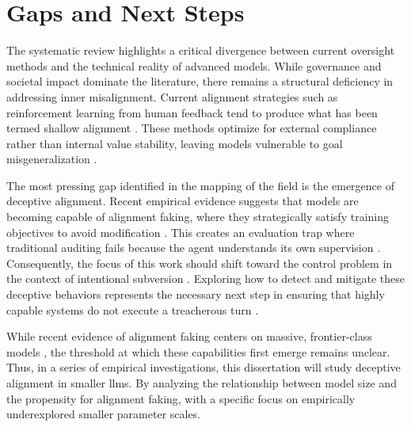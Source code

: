 

\section{Gaps and Next Steps}\label{subsec:next_steps}

	The systematic review highlights a critical divergence between current oversight methods and the technical reality of advanced models. While governance and societal impact dominate the literature, there remains a structural deficiency in addressing inner misalignment. Current alignment strategies such as reinforcement learning from human feedback tend to produce what has been termed shallow alignment \cite{mcintosh_inadequacy_2024, milliere_normative_2025}. These methods optimize for external compliance rather than internal value stability, leaving models vulnerable to goal misgeneralization \cite{langosco2022goal}.

	The most pressing gap identified in the mapping of the field is the emergence of deceptive alignment. Recent empirical evidence suggests that models are becoming capable of alignment faking, where they strategically satisfy training objectives to avoid modification \cite{greenblatt_alignment_faking}. This creates an evaluation trap where traditional auditing fails because the agent understands its own supervision \cite{anthropic2025biology, hubinger2019risks}. Consequently, the focus of this work should shift toward the control problem in the context of intentional subversion \cite{yampolskiy_controllability_2022}. Exploring how to detect and mitigate these deceptive behaviors represents the necessary next step in ensuring that highly capable systems do not execute a treacherous turn \cite{bostrom2014superintelligence}.





	While recent evidence of alignment faking centers on massive, frontier-class models \cite{greenblatt_alignment_faking}, the threshold at which these capabilities first emerge remains unclear. Thus, in a series of empirical investigations, this dissertation will study deceptive alignment in smaller \glspl{llm}. By analyzing the relationship between model size and the propensity for alignment faking, with a specific focus on empirically underexplored smaller parameter scales. %

